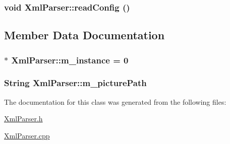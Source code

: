 \hypertarget{class_xml_parser_0304f0ee335be7eb3182a13bc25a3323}{
\subsubsection[{readConfig}]{\setlength{\rightskip}{0pt plus 5cm}void XmlParser::readConfig ()}}
\label{class_xml_parser_0304f0ee335be7eb3182a13bc25a3323}




\subsection{Member Data Documentation}
\hypertarget{class_xml_parser_bc042bdcf4cd5409a58f1390d90ed98c}{
\subsubsection[{m\_\-instance}]{ $\ast$ {\bf XmlParser::m\_\-instance} = 0}}
\label{class_xml_parser_bc042bdcf4cd5409a58f1390d90ed98c}


\hypertarget{class_xml_parser_74959bf42375b37dea6b6f32e96bfa33}{
\subsubsection[{m\_\-picturePath}]{\setlength{\rightskip}{0pt plus 5cm}String {\bf XmlParser::m\_\-picturePath}}}
\label{class_xml_parser_74959bf42375b37dea6b6f32e96bfa33}




The documentation for this class was generated from the following files:\begin{CompactItemize}
\item 
\hyperlink{_xml_parser_8h}{XmlParser.h}\item 
\hyperlink{_xml_parser_8cpp}{XmlParser.cpp}\end{CompactItemize}
